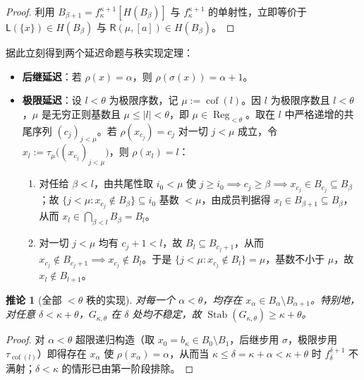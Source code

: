 \documentclass[11pt,a4paper]{ctexart}
\theoremstyle{definition}
\theoremstyle{plain}
\newtheorem{corollary}[definition]{推论}
\newcommand{\Stab}{\operatorname{Stab}}
\newcommand{\cof}{\operatorname{cof}}
\newcommand{\Reg}{\operatorname{Reg}}
\begin{document}
\begin{proof}
利用 $B_{\beta+1} = f_\kappa^{\kappa+1}[H(B_\beta)]$ 与 $f_\kappa^{\kappa+1}$ 的单射性，立即等价于 $\mathsf{L}(\{x\}) \in H(B_\beta)$ 与 $\mathsf{R}(\mu, [a]) \in H(B_\beta)$。
\end{proof}

据此立刻得到两个延迟命题与秩实现定理：
\begin{itemize}[leftmargin=2em]
  \item \textbf{后继延迟}：若 $\rho(x) = \alpha$，则 $\rho(\sigma(x)) = \alpha + 1$。
  \item \textbf{极限延迟}：设 $l < \theta$ 为极限序数，记 $\mu := \cof(l)$。因 $l$ 为极限序数且 $l < \theta$，$\mu$ 是无穷正则基数且 $\mu \le |l| < \theta$，即 $\mu \in \Reg_{<\theta}$。取在 $l$ 中严格递增的共尾序列 $(c_j)_{j<\mu}$。若 $\rho(x_{c_j}) = c_j$ 对一切 $j < \mu$ 成立，令 $x_l := \tau_\mu\bigl((x_{c_j})_{j<\mu}\bigr)$，则 $\rho(x_l) = l$：
    \begin{enumerate}[label=(\roman*)]
      \item 对任给 $\beta < l$，由共尾性取 $i_0 < \mu$ 使 $j \ge i_0 \implies c_j \ge \beta \implies x_{c_j} \in B_{c_j} \subseteq B_\beta$；故 $\{j < \mu : x_{c_j} \notin B_\beta\} \subseteq i_0$ 基数 $< \mu$，由成员判据得 $x_l \in B_{\beta+1} \subseteq B_\beta$，从而 $x_l \in \bigcap_{\beta < l} B_\beta = B_l$。
      \item 对一切 $j < \mu$ 均有 $c_j + 1 < l$，故 $B_l \subseteq B_{c_j+1}$，从而 $x_{c_j} \notin B_{c_j+1} \implies x_{c_j} \notin B_l$。于是 $\{j < \mu : x_{c_j} \notin B_l\} = \mu$，基数不小于 $\mu$，故 $x_l \notin B_{l+1}$。
    \end{enumerate}
\end{itemize}

\begin{corollary}[全部 $< \theta$ 秩的实现]
对每一个 $\alpha < \theta$，均存在 $x_\alpha \in B_\alpha \setminus B_{\alpha+1}$。特别地，对任意 $\delta < \kappa + \theta$，$G_{\kappa,\theta}$ 在 $\delta$ 处均不稳定，故 $\Stab(G_{\kappa,\theta}) \ge \kappa + \theta$。
\end{corollary}

\begin{proof}
对 $\alpha < \theta$ 超限递归构造（取 $x_0 = b_\kappa \in B_0 \setminus B_1$，后继步用 $\sigma$，极限步用 $\tau_{\cof(l)}$）即得存在 $x_\alpha$ 使 $\rho(x_\alpha) = \alpha$，从而当 $\kappa \le \delta = \kappa + \alpha < \kappa + \theta$ 时 $f_\delta^{\delta+1}$ 不满射；$\delta < \kappa$ 的情形已由第一阶段排除。
\end{proof}
\end{document}
